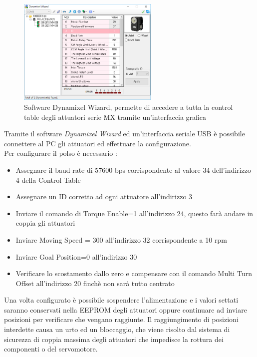 \documentclass[%
corpo=11pt,
twoside,
 stile=classica,
oldstyle,
greek,%
]{toptesi}
\begin{document}
	\begin{figure}
		\centering
		\includegraphics[width=0.6\textwidth]{image/wizard.png}
		
		\caption{Software Dynamixel Wizard, permette di accedere a tutta la control table degli attuatori serie MX tramite un'interfaccia grafica}
		\label{fig:wizard}
	\end{figure}
	
	Tramite il software \textit{Dynamixel Wizard} ed un'interfaccia seriale USB è possibile connettere al PC gli attuatori ed effettuare la configurazione. \\
	Per configurare il polso è necessario :
	\begin{itemize}
		\item Assegnare il baud rate di 57600 bps corrispondente  al valore 34 dell'indirizzo 4 della Control Table
		\item Assegnare un ID corretto ad ogni attuatore all'indirizzo 3
		\item Inviare il comando di Torque Enable=1 all'indirizzo 24, questo farà andare in coppia gli attuatori
		\item Inviare Moving Speed = 300 all'indirizzo 32 corrispondente a 10 rpm 
		\item Inviare  Goal Position=0 all'indirizzo 30
		\item Verificare lo scostamento dallo zero e compensare con il comando Multi Turn Offset all'indirizzo 20 finchè non sarà tutto centrato
		
	\end{itemize}
	Una volta configurato è possibile sospendere l'alimentazione e i valori settati saranno conservati nella EEPROM degli attuatori oppure continuare ad inviare posizioni per verificare che vengano raggiunte. 
	Il raggiungimento di posizioni interdette causa un urto ed un bloccaggio, che viene risolto dal sistema di sicurezza di coppia massima degli attuatori che impedisce la rottura dei componenti o del servomotore. 
	
\end{document}
